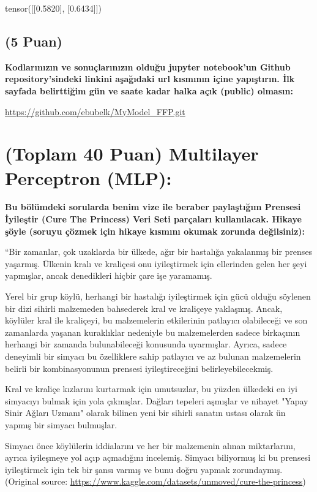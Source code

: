\documentclass[11pt]{article}
\begin{document}
tensor([[0.5820],
        [0.6434]])

\subsection{(5 Puan)} \textbf{Kodlarınızın ve sonuçlarınızın olduğu jupyter notebook'un Github repository'sindeki linkini aşağıdaki url kısmının içine yapıştırın. İlk sayfada belirttiğim gün ve saate kadar halka açık (public) olmasın:}

\url{https://github.com/ebubelk/MyModel_FFP.git}

\section{(Toplam 40 Puan) Multilayer Perceptron (MLP):} 
\textbf{Bu bölümdeki sorularda benim vize ile beraber paylaştığım Prensesi İyileştir (Cure The Princess) Veri Seti parçaları kullanılacak. Hikaye şöyle (soruyu çözmek için hikaye kısmını okumak zorunda değilsiniz):} 

``Bir zamanlar, çok uzaklarda bir ülkede, ağır bir hastalığa yakalanmış bir prenses yaşarmış. Ülkenin kralı ve kraliçesi onu iyileştirmek için ellerinden gelen her şeyi yapmışlar, ancak denedikleri hiçbir çare işe yaramamış.

Yerel bir grup köylü, herhangi bir hastalığı iyileştirmek için gücü olduğu söylenen bir dizi sihirli malzemeden bahsederek kral ve kraliçeye yaklaşmış. Ancak, köylüler kral ile kraliçeyi, bu malzemelerin etkilerinin patlayıcı olabileceği ve son zamanlarda yaşanan kuraklıklar nedeniyle bu malzemelerden sadece birkaçının herhangi bir zamanda bulunabileceği konusunda uyarmışlar. Ayrıca, sadece deneyimli bir simyacı bu özelliklere sahip patlayıcı ve az bulunan malzemelerin belirli bir kombinasyonunun prensesi iyileştireceğini belirleyebilecekmiş.

Kral ve kraliçe kızlarını kurtarmak için umutsuzlar, bu yüzden ülkedeki en iyi simyacıyı bulmak için yola çıkmışlar. Dağları tepeleri aşmışlar ve nihayet "Yapay Sinir Ağları Uzmanı" olarak bilinen yeni bir sihirli sanatın ustası olarak ün yapmış bir simyacı bulmuşlar.

Simyacı önce köylülerin iddialarını ve her bir malzemenin alınan miktarlarını, ayrıca iyileşmeye yol açıp açmadığını incelemiş. Simyacı biliyormuş ki bu prensesi iyileştirmek için tek bir şansı varmış ve bunu doğru yapmak zorundaymış. (Original source: \url{https://www.kaggle.com/datasets/unmoved/cure-the-princess})
\end{document}
